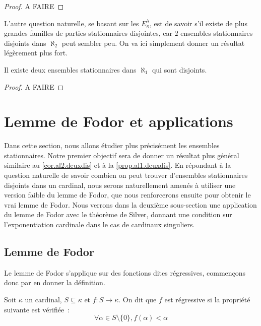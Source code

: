 \begin{proof}
  A FAIRE
\end{proof}

L'autre question naturelle, se basant sur les $E_\kappa^\lambda$, est de savoir
s'il existe de plus grandes familles de parties stationnaires disjointes, car
$2$ ensembles stationnaires disjoints dans $\aleph_2$ peut sembler peu. On va
ici simplement donner un résultat légèrement plus fort.

\begin{proposition}\label{prop.al1.deuxdis}
  Il existe deux ensembles stationnaires dans $\aleph_1$ qui sont disjoints.
\end{proposition}

\begin{proof}
  A FAIRE
\end{proof}

\section{Lemme de Fodor et applications}

Dans cette section, nous allons étudier plus précisément les ensembles
stationnaires. Notre premier objectif sera de donner un résultat plus général
similaire au \cref{cor.al2.deuxdis} et à la \cref{prop.al1.deuxdis}. En
répondant à la question naturelle de savoir combien on peut trouver d'ensembles
stationnaires disjoints dans un cardinal, nous serons naturellement amenés à
utiliser une version faible du lemme de Fodor, que nous renforcerons ensuite
pour obtenir le vrai lemme de Fodor. Nous verrons dans la deuxième sous-section
une application du lemme de Fodor avec le théorème de Silver, donnant une
condition sur l'exponentiation cardinale dans le cas de cardinaux singuliers.

\subsection{Lemme de Fodor}

Le lemme de Fodor s'applique sur des fonctions dites régressives, commençons
donc par en donner la définition.

\begin{definition}
  Soit $\kappa$ un cardinal, $S\subseteq \kappa$ et $f : S \to \kappa$. On
  dit que $f$ est régressive si la propriété suivante est vérifiée~:
  \[\forall \alpha \in S\setminus\{0\}, f(\alpha) < \alpha\]
\end{definition}

